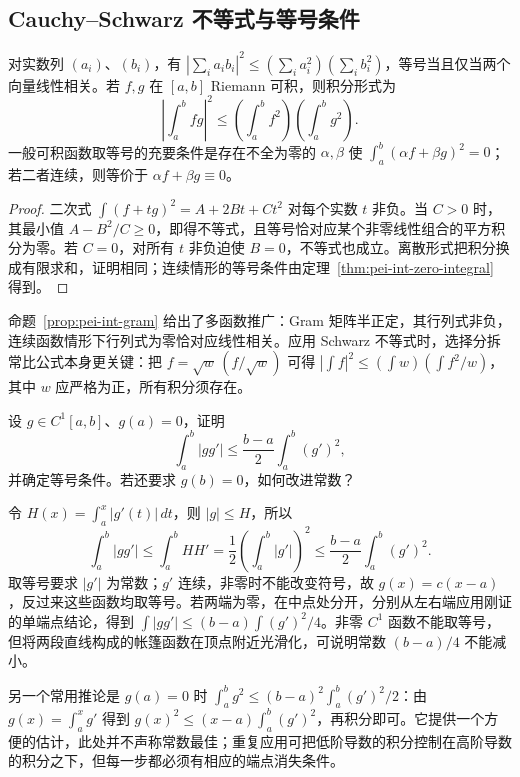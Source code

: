 \subsection{Cauchy--Schwarz 不等式与等号条件}
\begin{theorem}
\label{thm:pei-int-schwarz}
对实数列 $(a_i)$、$(b_i)$，有 $|\sum_i a_ib_i|^2\le(\sum_i a_i^2)(\sum_i b_i^2)$，等号当且仅当两个向量线性相关。若 $f,g$ 在 $[a,b]$ Riemann 可积，则积分形式为
\begin{equation}
 \left|\int_a^bfg\right|^2\le\left(\int_a^bf^2\right)\left(\int_a^bg^2\right).
 \label{eq:pei-int-schwarz}
\end{equation}
一般可积函数取等号的充要条件是存在不全为零的 $\alpha,\beta$ 使 $\int_a^b(\alpha f+\beta g)^2=0$；若二者连续，则等价于 $\alpha f+\beta g\equiv0$。
\end{theorem}
\begin{proof}
二次式 $\int(f+tg)^2=A+2Bt+Ct^2$ 对每个实数 $t$ 非负。当 $C>0$ 时，其最小值 $A-B^2/C\ge0$，即得不等式，且等号恰对应某个非零线性组合的平方积分为零。若 $C=0$，对所有 $t$ 非负迫使 $B=0$，不等式也成立。离散形式把积分换成有限求和，证明相同；连续情形的等号条件由定理~\ref{thm:pei-int-zero-integral} 得到。
\end{proof}
命题~\ref{prop:pei-int-gram} 给出了多函数推广：Gram 矩阵半正定，其行列式非负，连续函数情形下行列式为零恰对应线性相关。应用 Schwarz 不等式时，选择分拆常比公式本身更关键：把 $f=\sqrt w\,(f/\sqrt w)$ 可得 $|\int f|^2\le(\int w)(\int f^2/w)$，其中 $w$ 应严格为正，所有积分须存在。

\begin{example}
设 $g\in C^1[a,b]$、$g(a)=0$，证明
\[
 \int_a^b|gg'|\le\frac{b-a}{2}\int_a^b(g')^2,
\]
并确定等号条件。若还要求 $g(b)=0$，如何改进常数？
\end{example}
\begin{solve}
令 $H(x)=\int_a^x|g'(t)|\,dt$，则 $|g|\le H$，所以
\[
 \int_a^b|gg'|\le\int_a^bHH'=\frac12\left(\int_a^b|g'|\right)^2
 \le\frac{b-a}{2}\int_a^b(g')^2.
\]
取等号要求 $|g'|$ 为常数；$g'$ 连续，非零时不能改变符号，故 $g(x)=c(x-a)$，反过来这些函数均取等号。若两端为零，在中点处分开，分别从左右端应用刚证的单端点结论，得到 $\int|gg'|\le(b-a)\int(g')^2/4$。非零 $C^1$ 函数不能取等号，但将两段直线构成的帐篷函数在顶点附近光滑化，可说明常数 $(b-a)/4$ 不能减小。
\end{solve}
另一个常用推论是 $g(a)=0$ 时 $\int_a^bg^2\le(b-a)^2\int_a^b(g')^2/2$：由 $g(x)=\int_a^xg'$ 得到 $g(x)^2\le(x-a)\int_a^b(g')^2$，再积分即可。它提供一个方便的估计，此处并不声称常数最佳；重复应用可把低阶导数的积分控制在高阶导数的积分之下，但每一步都必须有相应的端点消失条件。

